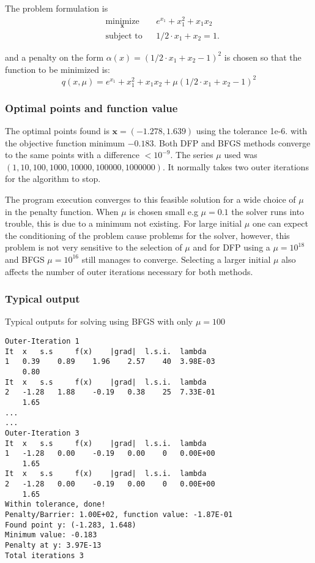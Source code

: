 The problem formulation is
\begin{equation*}
\begin{aligned}
& \underset{\mathbf{x}}{\text{minimize}}
& & e^{x_1} + x_1^2 + x_1 x_2 \\
& \text{subject to}
& & 1/2 \cdot x_1 + x_2 = 1.
\end{aligned}
\end{equation*}

and a penalty on the form $\alpha(x) = (1/2 \cdot x_1 + x_2 - 1)^2$ is chosen so that the function to be minimized is:
$$
q(x,\mu) = e^{x_1} + x_1^2 + x_1 x_2 + \mu (1/2 \cdot x_1 + x_2 - 1)^2
$$

\subsubsection{Optimal points and function value}
The optimal points found is $ \mathbf{x} = (-1.278, 1.639) $ using the tolerance 1e-6. with the objective function minimum $-0.183$. Both DFP and BFGS methods converge to the same points with a difference $< 10^{-9}$. The series $\mu$ used was $(1, 10, 100, 1000, 10000, 100000, 1000000)$. It normally takes two outer iterations for the algorithm to stop.

The program execution converges to this feasible solution for a wide choice of $\mu$ in the penalty function. When $\mu$ is chosen small e.g $\mu = 0.1$ the solver runs into trouble, this is due to a minimum not existing. For large initial $\mu$ one can expect the conditioning of the problem cause problems for the solver, however, this problem is not very sensitive to the selection of $\mu$ and for DFP using a $\mu = 10^{18}$ and BFGS $\mu = 10^{16}$ still manages to converge. Selecting a larger initial $\mu$ also affects the number of outer iterations necessary for both methods.

\subsubsection{Typical output}
Typical outputs for solving using BFGS with only $\mu = 100$

\begin{verbatim}
Outer-Iteration 1
It 	x 	s.s 	f(x) 	|grad| 	l.s.i. 	lambda
1 	0.39 	0.89 	1.96 	2.57 	40 	3.98E-03
 	0.80
It 	x 	s.s 	f(x) 	|grad| 	l.s.i. 	lambda
2 	-1.28 	1.88 	-0.19 	0.38 	25 	7.33E-01
 	1.65
...
...
Outer-Iteration 3
It 	x 	s.s 	f(x) 	|grad| 	l.s.i. 	lambda
1 	-1.28 	0.00 	-0.19 	0.00 	0 	0.00E+00
 	1.65
It 	x 	s.s 	f(x) 	|grad| 	l.s.i. 	lambda
2 	-1.28 	0.00 	-0.19 	0.00 	0 	0.00E+00
 	1.65
Within tolerance, done!
Penalty/Barrier: 1.00E+02, function value: -1.87E-01
Found point y: (-1.283, 1.648)
Minimum value: -0.183
Penalty at y: 3.97E-13
Total iterations 3
\end{verbatim}